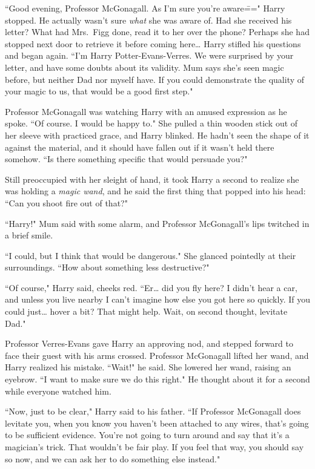 ``Good evening, Professor McGonagall. As I'm sure you're aware\===" Harry stopped. He actually wasn't sure \emph{what} she was aware of. Had she received his letter? What had Mrs.~Figg done, read it to her over the phone? Perhaps she had stopped next door to retrieve it before coming here{\ldots} Harry stifled his questions and began again. ``I'm Harry Potter-Evans-Verres. We were surprised by your letter, and have some doubts about its validity. Mum says she's seen magic before, but neither Dad nor myself have. If you could demonstrate the quality of your magic to us, that would be a good first step."

Professor McGonagall was watching Harry with an amused expression as he spoke. ``Of course. I would be happy to." She pulled a thin wooden stick out of her sleeve with practiced grace, and Harry blinked. He hadn't seen the shape of it against the material, and it should have fallen out if it wasn't held there somehow. ``Is there something specific that would persuade you?"

Still preoccupied with her sleight of hand, it took Harry a second to realize she was holding a \emph{magic wand}, and he said the first thing that popped into his head: ``Can you shoot fire out of that?"

``Harry!" Mum said with some alarm, and Professor McGonagall's lips twitched in a brief smile.

``I could, but I think that would be dangerous." She glanced pointedly at their surroundings. ``How about something less destructive?"

``Of course," Harry said, cheeks red. ``Er{\ldots} did you fly here? I didn't hear a car, and unless you live nearby I can't imagine how else you got here so quickly. If you could just{\ldots} hover a bit? That might help. Wait, on second thought, levitate Dad."

Professor Verres-Evans gave Harry an approving nod, and stepped forward to face their guest with his arms crossed. Professor McGonagall lifted her wand, and Harry realized his mistake. ``Wait!" he said. She lowered her wand, raising an eyebrow. ``I want to make sure we do this right." He thought about it for a second while everyone watched him.

``Now, just to be clear," Harry said to his father. ``If Professor McGonagall does levitate you, when you know you haven't been attached to any wires, that's going to be sufficient evidence. You're not going to turn around and say that it's a magician's trick. That wouldn't be fair play. If you feel that way, you should say so now, and we can ask her to do something else instead."

